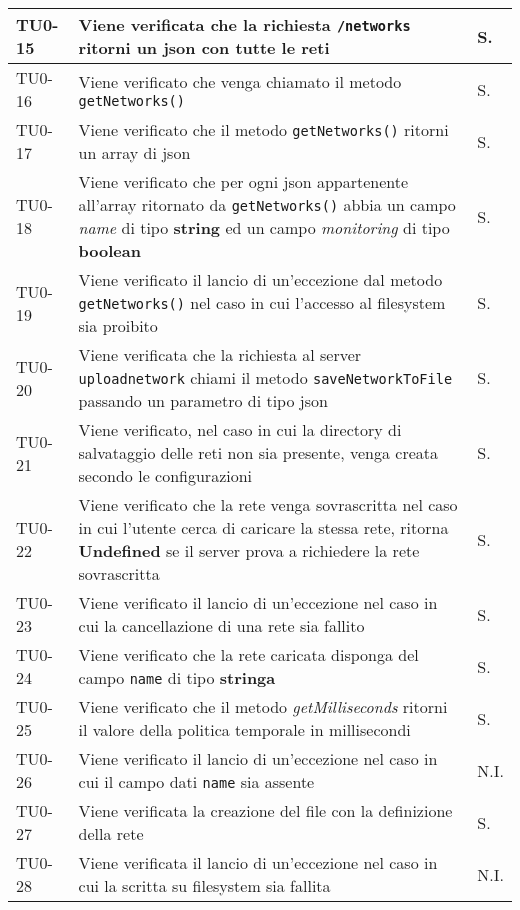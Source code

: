 \begin{longtable}{|C{.15\textwidth}|m{.66\textwidth}|C{.10\textwidth}|}
\hline 
{}TU0-15 & Viene verificata che la richiesta \texttt{/networks} ritorni un json con tutte le reti & S. \\ 
\hline 
TU0-16 & Viene verificato che venga chiamato il metodo \texttt{getNetworks()} & S. \\
\hline 
{}TU0-17 & Viene verificato che il metodo \texttt{getNetworks()} ritorni un array di json & S. \\ 
\hline
TU0-18 & Viene verificato che per ogni json appartenente all'array ritornato da \texttt{getNetworks()} abbia un campo \textit{name} di tipo \textbf{string} ed un campo \textit{monitoring} di tipo \textbf{boolean} & S. \\ 
\hline
{}TU0-19 & Viene verificato il lancio di un'eccezione dal metodo \texttt{getNetworks()} nel caso in cui l'accesso al filesystem sia proibito & S. \\ 
\hline 
TU0-20 & Viene verificata che la richiesta al server \texttt{uploadnetwork} chiami il metodo \texttt{saveNetworkToFile} passando un parametro di tipo json & S. \\ 
\hline 
{}TU0-21 & Viene verificato, nel caso in cui la directory di salvataggio delle reti non sia presente, venga creata secondo le configurazioni & S. \\ 
\hline 
TU0-22 & Viene verificato che la rete venga sovrascritta nel caso in cui l'utente cerca di caricare la stessa rete, ritorna \textbf{Undefined} se il server prova a richiedere la rete sovrascritta & S. \\
\hline
{}TU0-23 & Viene verificato il lancio di un'eccezione nel caso in cui la cancellazione di una rete sia fallito & S. \\ 
\hline
TU0-24 & Viene verificato che la rete caricata disponga del campo \texttt{name} di tipo \textbf{stringa} & S. \\ 
\hline
{}TU0-25 & Viene verificato che il metodo \textit{getMilliseconds} ritorni il valore della politica temporale in millisecondi & S.\\
\hline 
 TU0-26 & Viene verificato il lancio di un'eccezione nel caso in cui il campo dati \texttt{name} sia assente & N.I. \\ 
\hline 
{}TU0-27	 & Viene verificata la creazione del file con la definizione della rete & S. \\ 
\hline 
 TU0-28 & Viene verificata il lancio di un'eccezione nel caso in cui la scritta su filesystem sia fallita & N.I. \\ 

\end{longtable}
